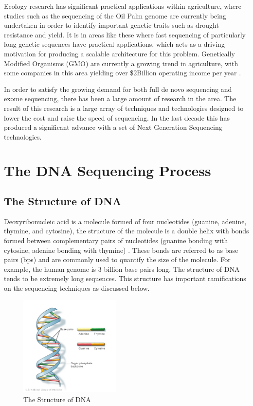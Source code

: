 Ecology research has significant practical applications within agriculture, where studies such as the sequencing of the Oil Palm genome are currently being undertaken in order to identify important genetic traits such as drought resistance and yield. It is in areas like these where fast sequencing of particularly long genetic sequences have practical applications, which acts as a driving motivation for producing a scalable architecture for this problem. Genetically Modified Organisms (GMO) are currently a growing trend in agriculture, with some companies in this area yielding over \$2Billion operating income per year \cite{Monsanto}.

In order to satisfy the growing demand for both full de novo sequencing and exome sequencing, there has been a large amount of research in the area. The result of this research is a large array of techniques and technologies designed to lower the cost and raise the speed of sequencing. In the last decade this has produced a significant advance with a set of Next Generation Sequencing technologies.




\section{The DNA Sequencing Process}
\subsection{The Structure of DNA}
Deoxyribonucleic acid is a molecule formed of four nucleotides (guanine, adenine, thymine, and cytosine), the structure of the molecule is a double helix with bonds formed between complementary pairs of nucleotides (guanine bonding with cytosine, adenine bonding with thymine) \cite{mandelkern1981dimensions}. These bonds are referred to as base pairs (bps) and are commonly used to quantify the size of the molecule. For example, the human genome is 3 billion base pairs long. The structure of DNA tends to be extremely long sequences. This structure has important ramifications on the sequencing techniques as discussed below.
\begin{figure}[h]
  \centering
  \includegraphics[width=0.45\textwidth]{./figs/dnastructure.jpg}
  \caption{The Structure of DNA \cite{USLoM}}
  \label{fig:pyro}
\end{figure}



